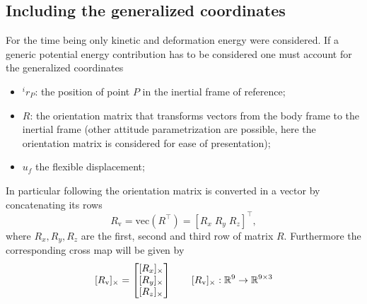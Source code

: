 \subsection{Including the generalized coordinates}
For the time being only kinetic and deformation energy were considered. If a generic potential energy contribution has to be considered one must account for the generalized coordinates
\begin{itemize}
	\item $^i r_P$: the position of point $P$ in the inertial frame of reference;
	\item $R$: the orientation matrix that transforms vectors from the body frame to the inertial frame (other attitude parametrization are possible, here the orientation matrix is considered for ease of presentation);
	\item $u_f$ the flexible displacement;
\end{itemize}
In particular following \cite{attitude_ph} the orientation matrix is converted in a vector by concatenating its rows
\begin{equation*}
	R_{\text{v}} = \text{vec}(R^\top) = [R_x \; R_y \; R_z]^\top,
\end{equation*}
where $R_{x}, R_{y}, R_{z}$ are the first, second and third row of matrix $R$. Furthermore the corresponding cross map will be given by
\begin{equation*}
\crmat{R_{\text{v}}} = 
\begin{bmatrix}
\crmat{R_x} \\
\crmat{R_y} \\
\crmat{R_z} \\
\end{bmatrix} \qquad 
\crmat{R_{\text{v}}} : \mathbb{R}^9 \rightarrow \mathbb{R}^{9 \times 3}
\end{equation*}

